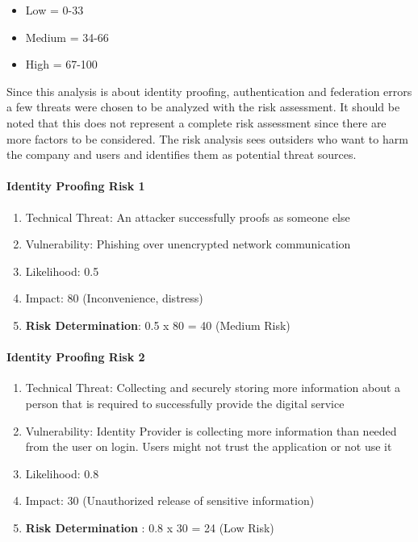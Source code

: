 \begin{itemize}
	\item Low =     0-33
	\item Medium = 34-66
	\item High =   67-100
\end{itemize}

Since this analysis is about identity proofing, authentication and federation errors a few threats were chosen to be analyzed with the risk assessment. It should be noted that this does not represent a complete risk assessment since there are more factors to be considered. The risk analysis sees outsiders who want to harm the company and users and identifies them as potential threat sources. 

\paragraph{Identity Proofing Risk 1}

\begin{enumerate}
	\item Technical Threat: An attacker successfully proofs as someone else
	\item Vulnerability: Phishing over unencrypted network communication
	\item Likelihood: 0.5
	\item Impact: 80 (Inconvenience, distress)
	\item \textbf{Risk Determination}: 0.5 x 80 = 40 (Medium Risk) 
\end{enumerate}

\paragraph{Identity Proofing Risk 2}
\begin{enumerate}
	\item Technical Threat: Collecting and securely storing more information about a person that is required to successfully provide the digital service
	\item Vulnerability: Identity Provider is collecting more information than needed from the user on login. Users might not trust the application or not use it
	\item Likelihood: 0.8
	\item Impact: 30  (Unauthorized release of sensitive information)
	\item \textbf{Risk Determination} : 0.8 x 30 = 24 (Low Risk)
\end{enumerate}


